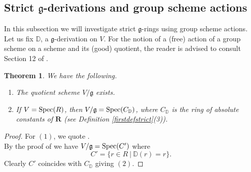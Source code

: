 \documentclass[10pt]{amsart}
\newtheorem{theorem}{Theorem}[section]
\theoremstyle{definition}
\begin{document}
\subsection{Strict $\mathfrak{g}$-derivations and group scheme actions}\label{secstr}
In this subsection we will investigate strict $\mathfrak{g}$-rings using group scheme actions. Let us fix $\mathbb{D}$, a $\mathfrak{g}$-derivation on $V$.
For the notion of a (free) action of a group scheme on a scheme and its (good) quotient, the reader is advised to consult Section 12 of \cite{MuAbel}.
\begin{theorem}\label{quotient}
We have the following.
\begin{enumerate}
\item The quotient scheme $V/\mathfrak{g}$ exists.

\item If $V=\operatorname{Spec}(R)$, then $V/\mathfrak{g}=\operatorname{Spec}(C_{\mathbb{D}})$, where $C_{\mathbb{D}}$ is the ring of absolute constants of $\mathbf{R}$ (see Definition \ref{firstdefstrict}(3)).
\end{enumerate}
\end{theorem}
\begin{proof}
For $(1)$, we quote \cite[Thm 1(A), p. 111]{MuAbel}.
\\
By the proof of \cite[Thm 1(A), p. 111]{MuAbel} we have $V/\mathfrak{g}=\operatorname{Spec}(C')$ where
$$C'=\{r\in R\ |\ \mathbb{D}(r)=r\}.$$
Clearly $C'$ coincides with $C_{\mathbb{D}}$ giving $(2)$.
\end{proof}
\end{document}
